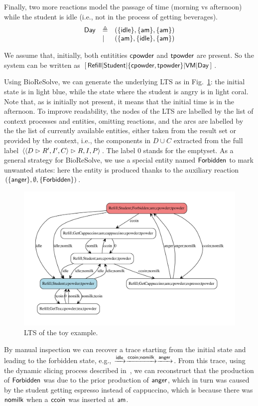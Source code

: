 Finally, two more reactions model the passage of time (morning vs afternoon) while the student is idle (i.e., not in the process of getting beverages).
\[
\begin{array}{lll}
\mathsf{Day} & \triangleq & (\{{\text{\sffamily idle}}\},\{{\text{\sffamily am}}\},\{{\text{\sffamily am}}\})\\
& | & (\{{\text{\sffamily am}}\},\{{\text{\sffamily idle}}\},\{{\text{\sffamily am}}\})
\end{array}
\]

We assume that, initially, both entitities ${\text{\sffamily cpowder}}$ and ${\text{\sffamily tpowder}}$ are present.
So the system can be written as 
\(
[\,\mathsf{Refill}
| \mathsf{Student}
| \{{\text{\sffamily cpowder}},{\text{\sffamily tpowder}}\} 
| \mathsf{VM}
| \mathsf{Day}\,]
\).


Using BioReSolve, we can generate the underlying LTS as in Fig.~\ref{fig:toylts}: the initial state is in light blue, while the state where the student is angry is in light coral.
Note that, as \am is initially not present, it means that the initial time is in the afternoon.
To improve readability, the nodes of the LTS are labelled by the list of context processes and entities, omitting reactions, and the arcs are labelled by the the list of currently available entities, either taken from the result set or provided by the context, i.e., the components in $D\cup C$ extracted from the full label $\langle \langle D\vartriangleright R',I',C\rangle\vartriangleright R,I,P\rangle$. The label $0$ stands for the emptyset.
As a general strategy for BioReSolve, we use a special entity named ${\text{\sffamily Forbidden}}$ to mark unwanted states: here the entity is produced thanks to the auxiliary reaction $(\{{\text{\sffamily anger}}\},\emptyset,\{{\text{\sffamily Forbidden}}\})$.

\begin{figure}
\includegraphics[scale=.3]{./figs/toylts}
\caption{LTS of the toy example.\label{fig:toylts}}
\end{figure}

By manual inspection we can recover a trace starting from the initial state and leading to the forbidden state, e.g., $\xrightarrow{{\text{\sffamily idle}}}\xrightarrow{{\text{\sffamily ccoin}};{\text{\sffamily nomilk}}}\xrightarrow{{\text{\sffamily anger}}}$. From this trace, using the dynamic slicing process described in~\cite{DBLP:journals/nc/BrodoBF24}, we can reconstruct that the production of ${\text{\sffamily Forbidden}}$ was due to the prior production of ${\text{\sffamily anger}}$, which in turn was caused by the student getting espresso instead of cappuccino, which is because there was ${\text{\sffamily nomilk}}$ when a ${\text{\sffamily ccoin}}$ was inserted at ${\text{\sffamily am}}$.
